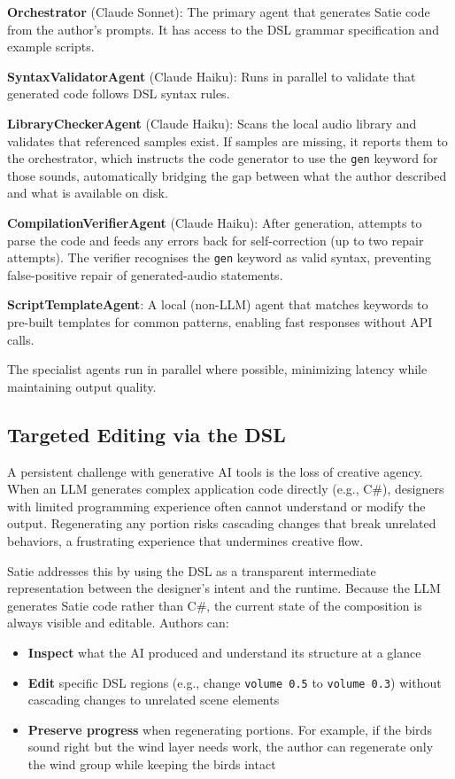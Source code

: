 \documentclass[sigconf,anonymous,review]{nimeart}
\begin{document}
\textbf{Orchestrator} (Claude Sonnet): The primary agent that generates Satie code from the author's prompts. It has access to the DSL grammar specification and example scripts.

\textbf{SyntaxValidatorAgent} (Claude Haiku): Runs in parallel to validate that generated code follows DSL syntax rules.

\textbf{LibraryCheckerAgent} (Claude Haiku): Scans the local audio library and validates that referenced samples exist. If samples are missing, it reports them to the orchestrator, which instructs the code generator to use the \texttt{gen} keyword for those sounds, automatically bridging the gap between what the author described and what is available on disk.

\textbf{CompilationVerifierAgent} (Claude Haiku): After generation, attempts to parse the code and feeds any errors back for self-correction (up to two repair attempts). The verifier recognises the \texttt{gen} keyword as valid syntax, preventing false-positive repair of generated-audio statements.

\textbf{ScriptTemplateAgent}: A local (non-LLM) agent that matches keywords to pre-built templates for common patterns, enabling fast responses without API calls.

The specialist agents run in parallel where possible, minimizing latency while maintaining output quality.

\subsection{Targeted Editing via the DSL}

A persistent challenge with generative AI tools is the loss of creative agency. When an LLM generates complex application code directly (e.g., C\#), designers with limited programming experience often cannot understand or modify the output. Regenerating any portion risks cascading changes that break unrelated behaviors, a frustrating experience that undermines creative flow.

Satie addresses this by using the DSL as a transparent intermediate representation between the designer's intent and the runtime. Because the LLM generates Satie code rather than C\#, the current state of the composition is always visible and editable. Authors can:

\begin{itemize}
    \item \textbf{Inspect} what the AI produced and understand its structure at a glance
    \item \textbf{Edit} specific DSL regions (e.g., change \texttt{volume 0.5} to \texttt{volume 0.3}) without cascading changes to unrelated scene elements
    \item \textbf{Preserve progress} when regenerating portions. For example, if the birds sound right but the wind layer needs work, the author can regenerate only the wind group while keeping the birds intact
\end{itemize}
\end{document}
